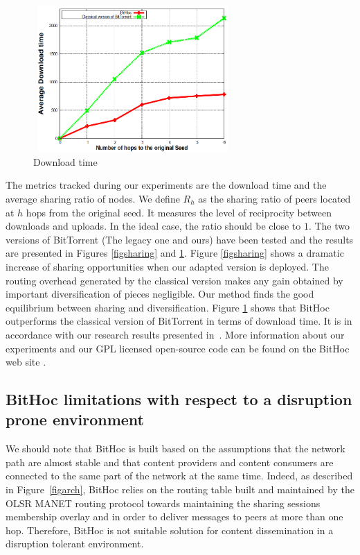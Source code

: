 \begin{figure}[!h]
  \begin{center}
    \includegraphics[width=3in,height=2.2in]{Chapitre2/downloadtime.png}
  \end{center}
  \caption{Download time}
  \label{FigDownloadtime}
\end{figure}

The metrics tracked during our experiments are the download time and the average sharing ratio of nodes. We define $R_{h}$ as the sharing ratio of peers located at $h$ hops from the original seed. It measures the level of reciprocity between downloads and uploads. In the ideal case, the ratio should be close to $1$. The two versions of BitTorrent (The legacy one and ours) have been tested and the results are presented in Figures \ref{figsharing} and \ref{FigDownloadtime}. Figure \ref{figsharing} shows a dramatic increase of sharing opportunities when our adapted version is deployed. The routing overhead generated by the classical version makes any gain obtained by important diversification of pieces negligible. Our method finds the good equilibrium between sharing and diversification. Figure \ref{FigDownloadtime} shows that BitHoc outperforms the classical version of BitTorrent in terms of download time. It is in accordance with our research results presented in~\cite{BitHocWeb}. More information about our experiments and our GPL licensed open-source code can be found on the BitHoc web site \cite{BitHocWeb}.

\subsection{BitHoc limitations with respect to a disruption prone environment}
\label{BitHoc:limitations}

We should note that BitHoc is built based on the assumptions that the network path are almost stable and that content providers and content consumers are connected to the same part of the network at the same time. Indeed, as described in Figure~\ref{figarch}, BitHoc relies on the routing table built and maintained by the OLSR MANET routing protocol towards maintaining the sharing sessions membership overlay and in order to deliver messages to peers at more than one hop. Therefore, BitHoc is not suitable solution for content dissemination in a disruption tolerant environment. 

